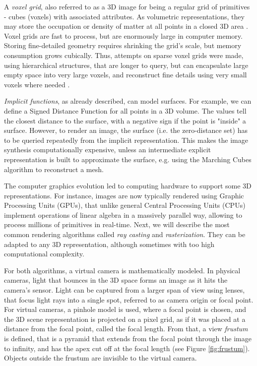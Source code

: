 A \textit{voxel grid}, also referred to as a 3D image for being a regular grid of primitives - cubes (voxels) with associated attributes. As volumetric representations, they may store the occupation or density of matter at all points in a closed 3D area \cite{aux:voxels98}. Voxel grids are fast to process, but are enormously large in computer memory. Storing fine-detailed geometry requires shrinking the grid's scale, but memory consumption grows cubically. Thus, attempts on sparse voxel grids were made, using hierarchical structures, that are longer to query, but can encapsulate large empty space into very large voxels, and reconstruct fine details using very small voxels where needed \cite{aux:voxels-sparse13}.

\textit{Implicit functions}, as already described, can model surfaces. For example, we can define a Signed Distance Function for all points in a 3D volume. The values tell the closest distance to the surface, with a negative sign if the point is "inside" a surface. However, to render an image, the surface (i.e. the zero-distance set) has to be queried repeatedly from the implicit representation. This makes the image synthesis computationally expensive, unless an intermediate explicit representation is built to approximate the surface, e.g. using the Marching Cubes algorithm \cite{aux:marching-cubes87} to reconstruct a mesh.

The computer graphics evolution led to computing hardware to support some 3D representations. For instance, images are now typically rendered using Graphic Processing Units (GPUs), that unlike general Central Processing Units (CPUs) implement operations of linear algebra in a massively parallel way, allowing to process millions of primitives in real-time. Next, we will describe the most common rendering algorithms called \textit{ray casting} and \textit{rasterization}. They can be adapted to any 3D representation, although sometimes with too high computational complexity.

For both algorithms, a virtual camera is mathematically modeled. In physical cameras, light that bounces in the 3D space forms an image as it hits the camera's sensor. Light can be captured from a larger span of view using lenses, that focus light rays into a single spot, referred to as camera origin or focal point. For virtual cameras, a pinhole model is used, where a focal point is chosen, and the 3D scene representation is projected on a pixel grid, as if it was placed at a distance from the focal point, called the focal length. From that, a view \textit{frustum} is defined, that is a pyramid that extends from the focal point through the image to infinity, and has the apex cut off at the focal length (see Figure \ref{fig:frustum}). Objects outside the frustum are invisible to the virtual camera.

